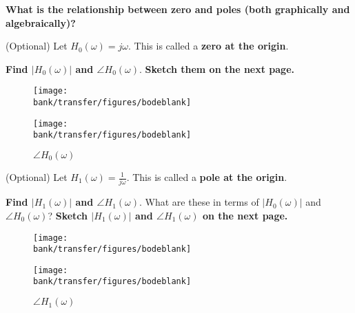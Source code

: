 \begin{enumerate}
\sol{
}

\qitem \textbf{What is the relationship between zero and poles (both graphically and algebraically)?}

\sol{

}

\qitem (Optional) Let $H_0(\omega) = j\omega$. This is called a \textbf{zero at the origin}.
\begin{enumerate}
  \qitem \textbf{Find $|H_0(\omega)|$ and $\angle H_0(\omega)$}.
  \qitem \textbf{Sketch them on the next page.}

\begin{figure}[!h]
  \centering
  \begin{minipage}[b]{0.45\textwidth}
  \texttt{[image: \\bank/transfer/figures/bodeblank]}
    \caption*{$|H_0(\omega)|$}
  \end{minipage}
  \hfill
  \begin{minipage}[b]{0.45\textwidth}
  \texttt{[image: \\bank/transfer/figures/bodeblank]}
    \caption*{$\angle H_0(\omega)$}
  \end{minipage}
\end{figure}
\end{enumerate}

\sol{
}

\qitem (Optional) Let $H_1(\omega) = \frac{1}{j\omega}$. This is called a \textbf{pole at the origin}.
\begin{enumerate}
  \qitem \textbf{Find $|H_1(\omega)|$ and $\angle H_1(\omega)$}. What are these in terms of $|H_0(\omega)|$ and $\angle H_0(\omega)$?
  \qitem \textbf{Sketch $|H_1(\omega)|$ and $\angle H_1(\omega)$ on the next page.}
\end{enumerate}

\begin{figure}[!h]
  \centering
  \begin{minipage}[b]{0.45\textwidth}
  \texttt{[image: \\bank/transfer/figures/bodeblank]}
    \caption*{$|H_1(\omega)|$}
  \end{minipage}
  \hfill
  \begin{minipage}[b]{0.45\textwidth}
  \texttt{[image: \\bank/transfer/figures/bodeblank]}
    \caption*{$\angle H_1(\omega)$}
  \end{minipage}
\end{figure}

\sol{
}

\end{enumerate}
